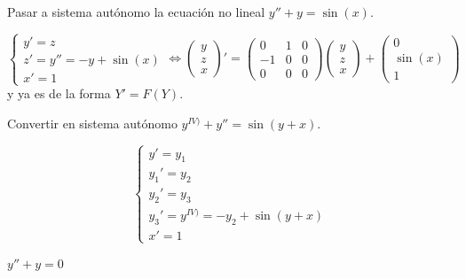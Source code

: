 \begin{ejer}
    Pasar a sistema aut\'onomo la ecuaci\'on no lineal $y''+y=\sin(x)$.
\end{ejer}
\begin{sol}
    $$\begin{cases}
        y'=z\\ z'=y''=-y+\sin(x) \\ x'=1
    \end{cases} \iff \begin{pmatrix}
        y \\ z \\ x 
    \end{pmatrix}' = \begin{pmatrix}
        0 & 1 & 0 \\ -1 & 0 & 0 \\ 0 & 0 & 0
    \end{pmatrix} \begin{pmatrix}
        y \\ z \\ x 
    \end{pmatrix} + \begin{pmatrix}
        0 \\ \sin (x) \\ 1
    \end{pmatrix}$$ y ya es de la forma $Y' = F(Y)$.
\end{sol} 
\begin{ejer}
    Convertir en sistema aut\'onomo $y^{IV)} + y'' = \sin(y+x)$.
\end{ejer}
\begin{sol}
    $$\begin{cases}
        y'=y_1 \\ y_1'=y_2 \\ y_2' = y_3 \\ y_3'=y^{IV)}=-y_2 + \sin(y+x) \\ x'=1
    \end{cases}$$
\end{sol}
\begin{ejer}
    $y''+y=0$
\end{ejer}
